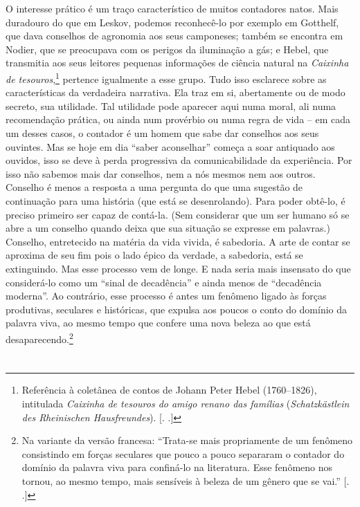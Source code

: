 O interesse prático é um traço característico de muitos contadores
natos. Mais duradouro do que em Leskov, podemos reconhecê-lo por exemplo
em Gotthelf, que dava conselhos de agronomia aos seus camponeses; também
se encontra em Nodier, que se preocupava com os perigos da iluminação a
gás; e Hebel, que transmitia aos seus leitores pequenas informações de
ciência natural na \emph{Caixinha de tesouros},\footnote{Referência à
  coletânea de contos de Johann Peter Hebel (1760--1826), intitulada
  \emph{Caixinha de tesouros do amigo renano das famílias}
  (\emph{Schatzkästlein des Rheinischen Hausfreundes}). [. .]}
pertence igualmente a esse grupo. Tudo isso esclarece sobre as
características da verdadeira narrativa. Ela traz em si, abertamente ou
de modo secreto, sua utilidade. Tal utilidade pode aparecer aqui numa
moral, ali numa recomendação prática, ou ainda num provérbio ou numa
regra de vida -- em cada um desses casos, o contador é um homem que sabe
dar conselhos aos seus ouvintes. Mas se hoje em dia ``saber aconselhar''
começa a soar antiquado aos ouvidos, isso se deve à perda progressiva da
comunicabilidade da experiência. Por isso não sabemos mais dar
conselhos, nem a nós mesmos nem aos outros. Conselho é menos a resposta
a uma pergunta do que uma sugestão de continuação para uma história (que
está se desenrolando). Para poder obtê-lo, é preciso primeiro ser capaz
de contá-la. (Sem considerar que um ser humano só se abre a um conselho
quando deixa que sua situação se expresse em palavras.) Conselho,
entretecido na matéria da vida vivida, é sabedoria. A arte de contar se
aproxima de seu fim pois o lado épico da verdade\label{supra2}, a sabedoria, está se
extinguindo. Mas esse processo vem de longe. E nada seria mais insensato
do que considerá-lo como um ``sinal de decadência'' e ainda menos de
``decadência moderna''. Ao contrário, esse processo é antes um fenômeno
ligado às forças produtivas, seculares e históricas, que expulsa aos
poucos o conto do domínio da palavra viva, ao mesmo tempo que confere
uma nova beleza ao que está desaparecendo.\footnote{Na variante da
  versão francesa: ``Trata-se mais propriamente de um fenômeno
  consistindo em forças seculares que pouco a pouco separaram o contador
  do domínio da palavra viva para confiná-lo na literatura. Esse
  fenômeno nos tornou, ao mesmo tempo, mais sensíveis à beleza de um
  gênero que se vai.'' [. .]}

\section{}

